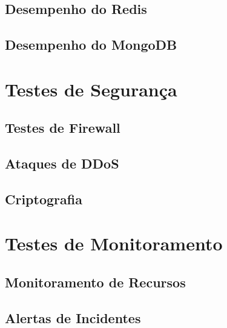 \subsection{Desempenho do Redis}

\subsection{Desempenho do MongoDB}

\section{Testes de Segurança}

\subsection{Testes de Firewall}

\subsection{Ataques de DDoS}

\subsection{Criptografia}

\section{Testes de Monitoramento}

\subsection{Monitoramento de Recursos}

\subsection{Alertas de Incidentes}



